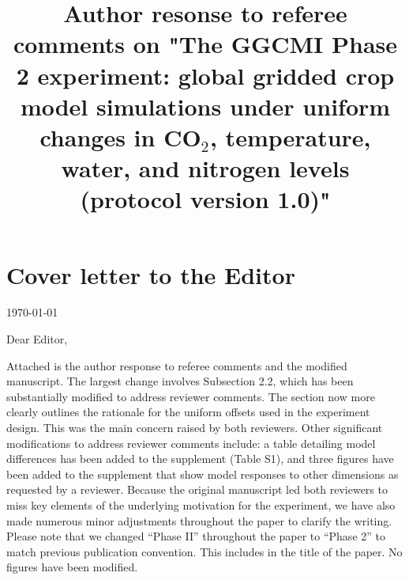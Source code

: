 \documentclass[gmd, manuscript]{copernicus} %
\begin{document}
\title{Author resonse to referee comments on "The GGCMI Phase 2 experiment: global gridded crop model simulations under uniform changes in CO$_2$, temperature, water, and nitrogen levels (protocol version 1.0)"}


\received{}
\pubdiscuss{} %
\revised{}
\accepted{}
\published{}
\maketitle

\section{Cover letter to the Editor}

\today
\bigskip

\noindent Dear Editor,

\bigskip
\bigskip

Attached is the author response to referee comments and the modified manuscript. 
The largest change involves Subsection 2.2, which has been substantially modified to address reviewer comments. The section now more clearly outlines the rationale for the uniform offsets used in the experiment design. This was the main concern raised by both reviewers. 
Other significant modifications to address reviewer comments include: a table detailing model differences has been added to the supplement (Table S1), and three figures have been added to the supplement that show model responses to other dimensions as requested by a reviewer. 
Because the original manuscript led both reviewers to miss key elements of the underlying motivation for the experiment, we have also made numerous minor adjustments throughout the paper to clarify the writing.
Please note that we changed “Phase II” throughout the paper to “Phase 2” to match previous publication convention. This includes in the title of the paper. 
No figures have been modified.
\end{document}

